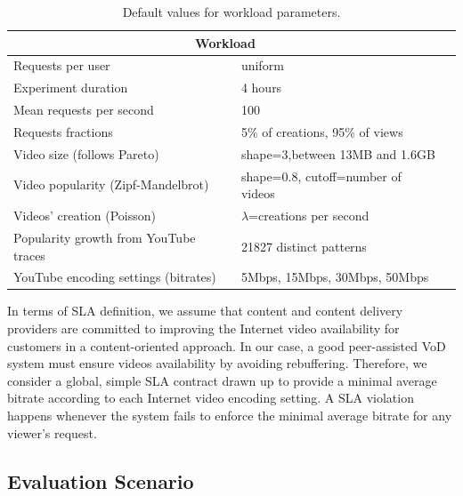\begin{table}
  \label{tab:workload_default_parameters}
	\begin{center}
		\caption{Default values for workload parameters.}
  		\label{tab:workload_parameters}
		\begin{tabular}{|p{6cm}|p{6cm}|l|}
			\hline
			\multicolumn{2}{|c|}{Workload} \\
			\hline
			\hline
			Requests per user&uniform\\
			\hline
			Experiment duration&4 hours\\
			\hline
			Mean requests per second&100\\
			\hline
			Requests fractions&5\% of creations, 95\% of views\\
			\hline
			Video size (follows Pareto)&shape=3,between 13MB and 1.6GB\\%
			\hline
			Video popularity (Zipf-Mandelbrot)&shape=0.8, cutoff=number of videos\\
			\hline
			Videos{'} creation (Poisson)&$\lambda$=creations per second\\
			\hline
			Popularity growth from YouTube traces&21827 distinct patterns\\
			\hline
			YouTube encoding settings (bitrates)&5Mbps, 15Mbps, 30Mbps, 50Mbps\\
			\hline
		\end{tabular}
	\end{center}
\end{table}

In terms of SLA definition, we assume that content and content delivery providers are committed to improving the Internet video availability for customers in a content-oriented approach. In our case, a good peer-assisted VoD system must ensure videos availability by avoiding rebuffering. Therefore, we consider a global, simple SLA contract drawn up to provide a minimal average bitrate according to each Internet video encoding setting. A SLA violation happens whenever the system fails to enforce the minimal average bitrate for any viewer's request. 


\subsection{Evaluation Scenario}
\label{subsec:methodology_evaluation_scenario}

